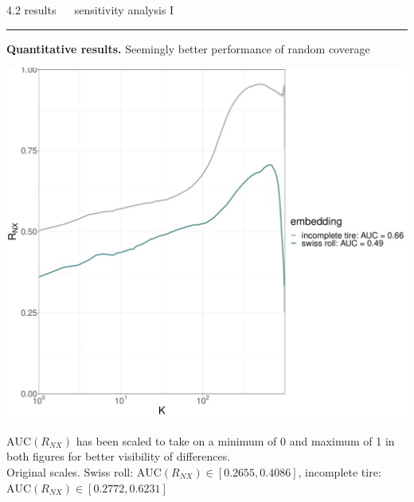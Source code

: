 \documentclass[11pt, compress, t, notes = noshow, xcolor = table, 
aspectratio = 1610]{beamer}
\begin{document}
\LARGE
\begin{frame}{\textcolor{gray!90}{4.2 results} ~~ sensitivity analysis I}
\normalsize
\vspace{-0.5cm}
\noindent \textcolor{gray!90}{\rule{\textwidth}{1pt}}
\smallskip

\textbf{Quantitative results.} Seemingly better performance of random coverage

\vspace{0.3cm}

\includegraphics[trim = 0 0 0 0, clip, %
    width = \textwidth]{figures/sensitivity_landmarks_auc}
    
\vfill

\scriptsize
$\text{AUC}(R_{NX})$ has been scaled to take on a minimum of 0 and maximum of 1 
in both figures for better visibility of differences. \\
Original scales. Swiss roll: $\text{AUC}(R_{NX}) \in [0.2655, 0.4086]$, 
incomplete tire: $\text{AUC}(R_{NX}) \in [0.2772, 0.6231]$

\end{frame}

\end{document}
